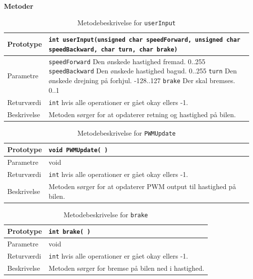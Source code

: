 \newpage
\textbf{Metoder} 



\begin{table}[H]
\begin{tabularx}{\textwidth}{| L{2.5 cm} | Z |} \hline
Prototype & \texttt{int userInput(unsigned char speedForward, unsigned char speedBackward, 
	char turn, char brake)} \\\hline
Parametre & \texttt{speedForward} \newline Den ønskede hastighed fremad. 0..255\newline
		\texttt{speedBackward} \newline Den ønskede hastighed bagud. 0..255\newline
		\texttt{turn} \newline Den ønskede drejning på forhjul. -128..127\newline
		\texttt{brake} \newline Der skal bremses. 0..1  \\\hline
Returværdi &  \texttt{int}  hvis alle operationer er gået okay ellers -1. \\\hline
Beskrivelse & Metoden sørger for at opdaterer retning og hastighed på bilen. \\\hline
\end{tabularx}
\caption{Metodebeskrivelse for \texttt{userInput}}
\label{table:met_userInput}
\end{table}



\begin{table}[H]
	\begin{tabularx}{\textwidth}{| L{2.5 cm} | Z |} \hline
		Prototype & \texttt{void PWMUpdate( )}		\\\hline
		Parametre &  void 							\\\hline
		Returværdi &  \texttt{int}  hvis alle operationer er gået okay ellers -1. \\\hline
		Beskrivelse & Metoden sørger for at opdaterer PWM output til hastighed på bilen. \\\hline
	\end{tabularx}
	\caption{Metodebeskrivelse for \texttt{PWMUpdate}}
	\label{table:met_PWMUpdate}
\end{table}

\begin{table}[H]
	\begin{tabularx}{\textwidth}{| L{2.5 cm} | Z |} \hline
		Prototype & \texttt{int brake( )} \\\hline
		Parametre &  void
		\\\hline
		Returværdi &  \texttt{int}  hvis alle operationer er gået okay ellers -1. \\\hline
		Beskrivelse & Metoden sørger for bremse på bilen ned i hastighed. \\\hline
	\end{tabularx}
	\caption{Metodebeskrivelse for \texttt{brake}}
	\label{table:met_brake}
\end{table}

